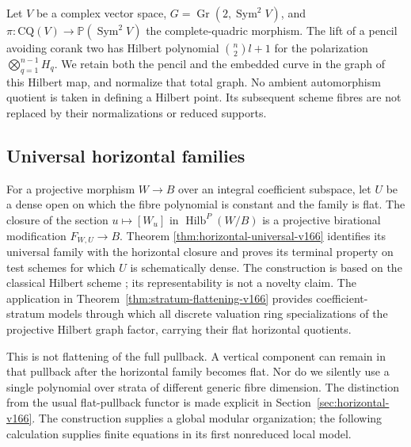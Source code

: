 \documentclass[11pt,reqno]{amsart}
\numberwithin{equation}{section}
\theoremstyle{definition}\newtheorem{definition}[theorem]{Definition}
\theoremstyle{remark}\newtheorem{remark}[theorem]{Remark}
\newcommand{\Pj}{\mathbb P}\newcommand{\A}{\mathbb A}
\DeclareMathOperator{\Sym}{Sym}\DeclareMathOperator{\Gr}{Gr}
\begin{document}
Let $V$ be a complex vector space, $G=\Gr(2,\Sym^2V)$, and
$\pi:\mathrm{CQ}(V)\to\Pj(\Sym^2V)$ the complete-quadric morphism.
The lift of a pencil avoiding corank two has Hilbert polynomial
$\binom n2 l+1$ for the polarization
$\bigotimes_{q=1}^{n-1}H_q$. We retain both the pencil and the
embedded curve in the graph of this Hilbert map, and normalize
that total graph. No ambient automorphism quotient is taken in
defining a Hilbert point. Its subsequent scheme fibres are not
replaced by their normalizations or reduced supports.

\subsection{Universal horizontal families}
For a projective morphism $W\to B$ over an integral coefficient
subspace, let $U$ be a dense open on which the fibre polynomial is
constant and the family is flat. The closure of the section
$u\mapsto[W_u]$ in $\operatorname{Hilb}^{P}(W/B)$ is a projective
birational modification $F_{W,U}\to B$. Theorem
\ref{thm:horizontal-universal-v166} identifies its universal
family with the horizontal closure and proves its terminal
property on test schemes for which $U$ is schematically dense.
The construction is based on the classical Hilbert scheme
\cite{Grothendieck166}; its representability is not a novelty claim.
The application in Theorem~\ref{thm:stratum-flattening-v166}
provides coefficient-stratum models through which all discrete
valuation ring specializations of the projective Hilbert graph
factor, carrying their flat horizontal quotients.

This is not flattening of the full pullback. A vertical component
can remain in that pullback after the horizontal family becomes
flat. Nor do we silently use a single polynomial over strata of
different generic fibre dimension. The distinction from the usual
flat-pullback functor is made explicit in
Section~\ref{sec:horizontal-v166}. The construction supplies a
global modular organization; the following calculation supplies
finite equations in its first nonreduced local model.
\end{document}
